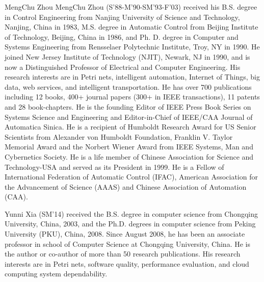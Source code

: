 \documentclass[journal]{IEEEtran}
\begin{document}
\begin{IEEEbiography}{MengChu Zhou}
MengChu Zhou (S'88-M'90-SM'93-F'03) received his B.S. degree in Control Engineering from Nanjing University of Science and Technology, Nanjing, China in 1983, M.S. degree in Automatic Control from Beijing Institute of Technology, Beijing, China in 1986, and Ph. D. degree in Computer and Systems Engineering from Rensselaer Polytechnic Institute, Troy, NY in 1990. He joined New Jersey Institute of Technology (NJIT), Newark, NJ in 1990, and is now a Distinguished Professor of Electrical and Computer Engineering. His research interests are in Petri nets, intelligent automation, Internet of Things, big data, web services, and intelligent transportation. He has over 700 publications including 12 books, 400+ journal papers (300+ in IEEE transactions), 11 patents and 28 book-chapters. He is the founding Editor of IEEE Press Book Series on Systems Science and Engineering and Editor-in-Chief of IEEE/CAA Journal of Automatica Sinica. He is a recipient of Humboldt Research Award for US Senior Scientists from Alexander von Humboldt Foundation, Franklin V. Taylor Memorial Award and the Norbert Wiener Award from IEEE Systems, Man and Cybernetics Society. He is a life member of Chinese Association for Science and Technology-USA and served as its President in 1999. He is a Fellow of International Federation of Automatic Control (IFAC), American Association for the Advancement of Science (AAAS) and Chinese Association of Automation (CAA).
\end{IEEEbiography}

\begin{IEEEbiography}{Yunni Xia}
(SM'14) received the B.S. degree in computer science from Chongqing University, China, 2003, and the Ph.D. degrees in computer science from Peking University (PKU), China, 2008. Since August 2008, he has been an associate professor in school of Computer Science at Chongqing University, China. He is the author or co-author of more than 50 research publications. His research interests are in Petri nets, software quality, performance evaluation, and cloud computing system dependability.
\end{IEEEbiography}
\end{document}
